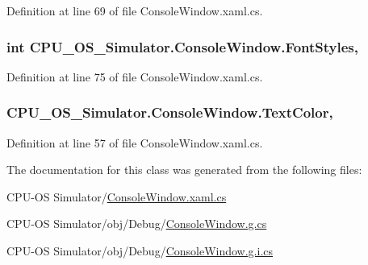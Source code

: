 Definition at line 69 of file Console\+Window.\+xaml.\+cs.

\hypertarget{class_c_p_u___o_s___simulator_1_1_console_window_a1984ceb7ee007669685c8de6c4554b06}{}
\subsubsection[{Font\+Styles}]{\setlength{\rightskip}{0pt plus 5cm}int C\+P\+U\+\_\+\+O\+S\+\_\+\+Simulator.\+Console\+Window.\+Font\+Styles\hspace{0.3cm}{\ttfamily [get]}, {\ttfamily [set]}}\label{class_c_p_u___o_s___simulator_1_1_console_window_a1984ceb7ee007669685c8de6c4554b06}


Definition at line 75 of file Console\+Window.\+xaml.\+cs.

\hypertarget{class_c_p_u___o_s___simulator_1_1_console_window_a9ed1d4cf5229b50e355092d33ea0c3e6}{}
\subsubsection[{Text\+Color}]{ C\+P\+U\+\_\+\+O\+S\+\_\+\+Simulator.\+Console\+Window.\+Text\+Color\hspace{0.3cm}{\ttfamily [get]}, {\ttfamily [set]}}\label{class_c_p_u___o_s___simulator_1_1_console_window_a9ed1d4cf5229b50e355092d33ea0c3e6}


Definition at line 57 of file Console\+Window.\+xaml.\+cs.



The documentation for this class was generated from the following files\+:\begin{DoxyCompactItemize}
\item 
C\+P\+U-\/\+O\+S Simulator/\hyperlink{_console_window_8xaml_8cs}{Console\+Window.\+xaml.\+cs}\item 
C\+P\+U-\/\+O\+S Simulator/obj/\+Debug/\hyperlink{_console_window_8g_8cs}{Console\+Window.\+g.\+cs}\item 
C\+P\+U-\/\+O\+S Simulator/obj/\+Debug/\hyperlink{_console_window_8g_8i_8cs}{Console\+Window.\+g.\+i.\+cs}\end{DoxyCompactItemize}
